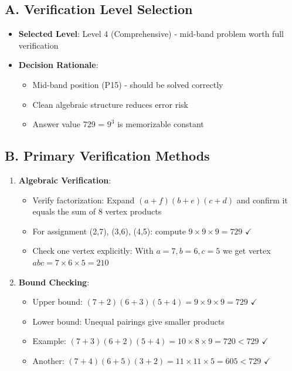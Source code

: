\documentclass[]{article}
\begin{document}
\begin{verificationbox}
\subsection*{A. Verification Level Selection}
\begin{itemize}[leftmargin=*]
    \item \textbf{Selected Level}: Level 4 (Comprehensive) - mid-band problem worth full verification
    \item \textbf{Decision Rationale}:
    \begin{itemize}
        \item Mid-band position (P15) - should be solved correctly
        \item Clean algebraic structure reduces error risk
        \item Answer value 729 = $9^3$ is memorizable constant
    \end{itemize}
\end{itemize}

\subsection*{B. Primary Verification Methods}
\begin{enumerate}
    \item \textbf{Algebraic Verification}: 
    \begin{itemize}
        \item Verify factorization: Expand $(a+f)(b+e)(c+d)$ and confirm it equals the sum of 8 vertex products
        \item For assignment (2,7), (3,6), (4,5): compute $9 \times 9 \times 9 = 729$ $\checkmark$
        \item Check one vertex explicitly: With $a=7, b=6, c=5$ we get vertex $abc = 7 \times 6 \times 5 = 210$
    \end{itemize}
    
    \item \textbf{Bound Checking}:
    \begin{itemize}
        \item Upper bound: $(7+2)(6+3)(5+4) = 9 \times 9 \times 9 = 729$ $\checkmark$
        \item Lower bound: Unequal pairings give smaller products
        \item Example: $(7+3)(6+2)(5+4) = 10 \times 8 \times 9 = 720 < 729$ $\checkmark$
        \item Another: $(7+4)(6+5)(3+2) = 11 \times 11 \times 5 = 605 < 729$ $\checkmark$
    \end{itemize}
    

\end{enumerate}
\end{verificationbox}
\end{document}
